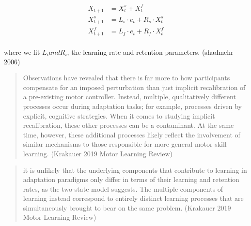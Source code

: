 \documentclass[../main.tex]{subfiles}
\begin{document}
\[
\begin{aligned}
X_{t+1} &= X^{s}_{t} + X^f_t \\
X^s_{t+1} &= L_s \cdot e_t + R_s \cdot X^s_{t} \\
X^f_{t+1} &= L_f \cdot e_t + R_f \cdot X^f_{t} \\
\end{aligned}
\]

where we fit \(L_i and R_i\), the learning rate and retention
parameters. (shadmehr 2006)

\begin{quote}
Observations have revealed that there is far more to how participants
compensate for an imposed perturbation than just implicit recalibration
of a pre-existing motor controller. Instead, multiple, qualitatively
different processes occur during adaptation tasks; for example,
processes driven by explicit, cognitive strategies. When it comes to
studying implicit recalibration, these other processes can be a
contaminant. At the same time, however, these additional processes
likely reflect the involvement of similar mechanisms to those
responsible for more general motor skill learning. (Krakauer 2019 Motor
Learning Review)
\end{quote}

\begin{quote}
it is unlikely that the underlying components that contribute to
learning in adaptation paradigms only differ in terms of their learning
and retention rates, as the two-state model suggests. The multiple
components of learning instead correspond to entirely distinct learning
processes that are simultaneously brought to bear on the same problem.
(Krakauer 2019 Motor Learning Review)
\end{quote}



\end{document}
